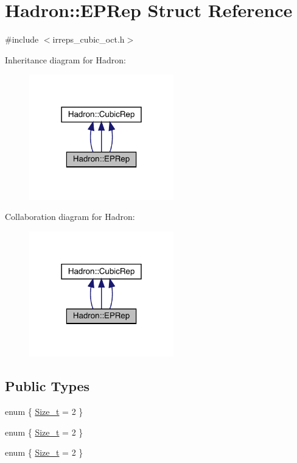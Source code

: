 \hypertarget{structHadron_1_1EPRep}{}\section{Hadron\+:\+:E\+P\+Rep Struct Reference}
\label{structHadron_1_1EPRep}


{\ttfamily \#include $<$irreps\+\_\+cubic\+\_\+oct.\+h$>$}



Inheritance diagram for Hadron\+:
\nopagebreak
\begin{figure}[H]
\begin{center}
\leavevmode
\includegraphics[width=178pt]{d8/d73/structHadron_1_1EPRep__inherit__graph}
\end{center}
\end{figure}


Collaboration diagram for Hadron\+:
\nopagebreak
\begin{figure}[H]
\begin{center}
\leavevmode
\includegraphics[width=178pt]{dc/d5b/structHadron_1_1EPRep__coll__graph}
\end{center}
\end{figure}
\subsection*{Public Types}
\begin{DoxyCompactItemize}
\item 
enum \{ \mbox{\hyperlink{structHadron_1_1EPRep_a76aaef16c5a8e22f7add4884e6c54d01acb7f3437b2518d8dcf731196499ff41c}{Size\+\_\+t}} = 2
 \}
\item 
enum \{ \mbox{\hyperlink{structHadron_1_1EPRep_a76aaef16c5a8e22f7add4884e6c54d01acb7f3437b2518d8dcf731196499ff41c}{Size\+\_\+t}} = 2
 \}
\item 
enum \{ \mbox{\hyperlink{structHadron_1_1EPRep_a76aaef16c5a8e22f7add4884e6c54d01acb7f3437b2518d8dcf731196499ff41c}{Size\+\_\+t}} = 2
 \}
\end{DoxyCompactItemize}
